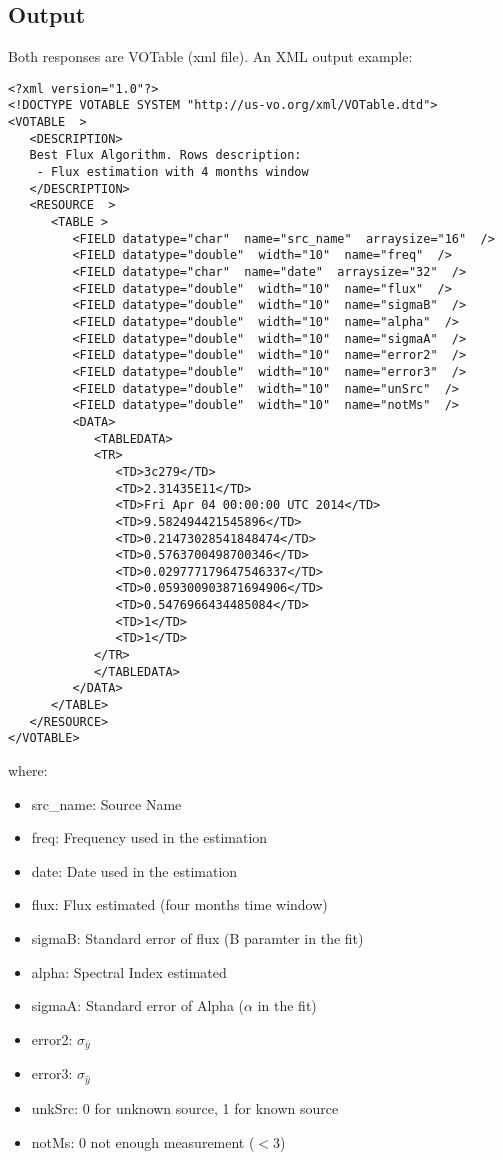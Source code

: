 \documentclass[10pt]{article}
\begin{document}
\subsection{Output}
\noindent Both responses are VOTable (xml file). An XML output example:
\lstset{language=XML}
\begin{lstlisting}
<?xml version="1.0"?>
<!DOCTYPE VOTABLE SYSTEM "http://us-vo.org/xml/VOTable.dtd">
<VOTABLE  >
   <DESCRIPTION>
   Best Flux Algorithm. Rows description: 
    - Flux estimation with 4 months window
   </DESCRIPTION>
   <RESOURCE  >
      <TABLE >
         <FIELD datatype="char"  name="src_name"  arraysize="16"  />
         <FIELD datatype="double"  width="10"  name="freq"  />
         <FIELD datatype="char"  name="date"  arraysize="32"  />
         <FIELD datatype="double"  width="10"  name="flux"  />
         <FIELD datatype="double"  width="10"  name="sigmaB"  />
         <FIELD datatype="double"  width="10"  name="alpha"  />
         <FIELD datatype="double"  width="10"  name="sigmaA"  />
         <FIELD datatype="double"  width="10"  name="error2"  />
         <FIELD datatype="double"  width="10"  name="error3"  />
         <FIELD datatype="double"  width="10"  name="unSrc"  />
         <FIELD datatype="double"  width="10"  name="notMs"  />
         <DATA>
            <TABLEDATA>
            <TR>
               <TD>3c279</TD>
               <TD>2.31435E11</TD>
               <TD>Fri Apr 04 00:00:00 UTC 2014</TD>
               <TD>9.582494421545896</TD>
               <TD>0.21473028541848474</TD>
               <TD>0.5763700498700346</TD>
               <TD>0.029777179647546337</TD>
               <TD>0.059300903871694906</TD>
               <TD>0.5476966434485084</TD>
               <TD>1</TD>
               <TD>1</TD>
            </TR>
            </TABLEDATA>
         </DATA>
      </TABLE>
   </RESOURCE>
</VOTABLE>
\end{lstlisting}

\noindent where:
\begin{itemize}
    \item src\_name: Source Name
    \item freq: Frequency used in the estimation
    \item date: Date used in the estimation
    \item flux: Flux estimated (four months time window)
    \item sigmaB: Standard error of flux (B paramter in the fit)
    \item alpha: Spectral Index estimated
    \item sigmaA: Standard error of Alpha ($\alpha$ in the fit)
    \item error2: $\sigma_{\bar{y}}$ %
    \item error3: $\sigma_{\hat{y}}$
    \item unkSrc: 0 for unknown source, 1 for known source
    \item notMs: 0 not enough measurement ($<$3)
\end{itemize}
\end{document}

